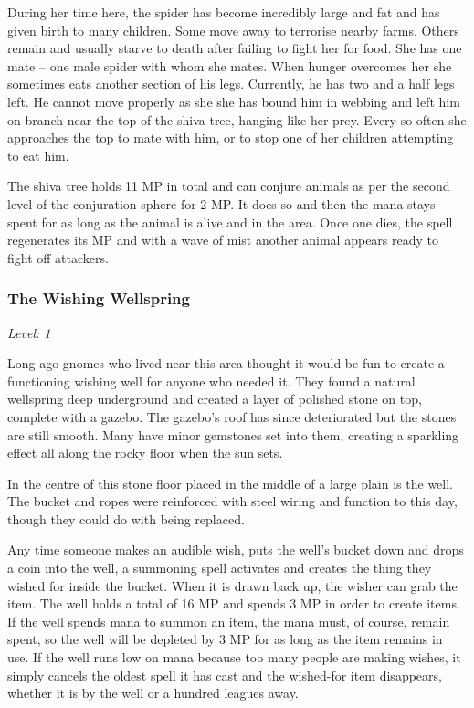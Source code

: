 During her time here, the spider has become incredibly large and fat and has given birth to many children.  Some move away to terrorise nearby farms.  Others remain and usually starve to death after failing to fight her for food.  She has one mate -- one male spider with whom she mates.  When hunger overcomes her she sometimes eats another section of his legs.  Currently, he has two and a half legs left.  He cannot move properly as she she has bound him in webbing and left him on branch near the top of the shiva tree, hanging like her prey.  Every so often she approaches the top to mate with him, or to stop one of her children attempting to eat him.

The shiva tree holds 11 MP in total and can conjure animals as per the second level of the conjuration sphere for 2 MP.  It does so and then the mana stays spent for as long as the animal is alive and in the area.  Once one dies, the spell regenerates its MP and with a wave of mist another animal appears ready to fight off attackers.

\subsubsection{The Wishing Wellspring}

\textit{Level: 1}

Long ago gnomes who lived near this area thought it would be fun to create a functioning wishing well for anyone who needed it.  They found a natural wellspring deep underground and created a layer of polished stone on top, complete with a gazebo.  The gazebo's roof has since deteriorated but the stones are still smooth.  Many have minor gemstones set into them, creating a sparkling effect all along the rocky floor when the sun sets.

In the centre of this stone floor placed in the middle of a large plain is the well.  The bucket and ropes were reinforced with steel wiring and function to this day, though they could do with being replaced.

Any time someone makes an audible wish, puts the well's bucket down and drops a coin into the well, a summoning spell activates and creates the thing they wished for inside the bucket.  When it is drawn back up, the wisher can grab the item.  The well holds a total of 16 MP and spends 3 MP in order to create items.  If the well spends mana to summon an item, the mana must, of course, remain spent, so the well will be depleted by 3 MP for as long as the item remains in use.  If the well runs low on mana because too many people are making wishes, it simply cancels the oldest spell it has cast and the wished-for item disappears, whether it is by the well or a hundred leagues away.


